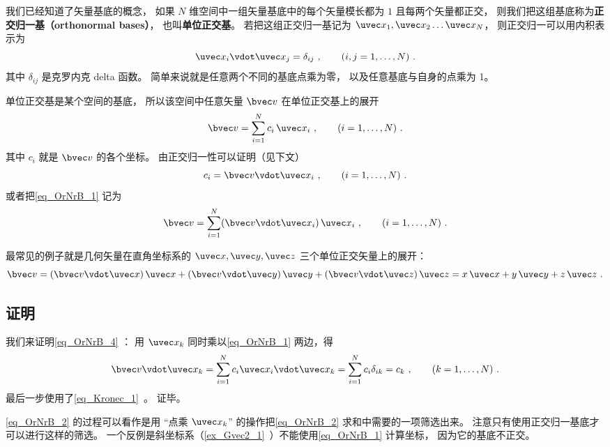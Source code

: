 

我们已经知道了矢量基底的概念， 如果 $N$ 维空间中一组矢量基底中的每个矢量模长都为 $1$ 且每两个矢量都正交， 则我们把这组基底称为\textbf{正交归一基（orthonormal bases）}， 也叫\textbf{单位正交基}。 若把这组正交归一基记为 $\uvec x_1,\uvec x_2\dots\uvec x_N$， 则正交归一可以用内积表示为
\begin{equation}\label{eq_OrNrB_3}
\uvec x_i \vdot \uvec x_j = \delta_{ij} ~,\qquad (i,j = 1,\dots, N)~.
\end{equation}
其中 $\delta_{ij}$ 是克罗内克 delta 函数。 简单来说就是任意两个不同的基底点乘为零， 以及任意基底与自身的点乘为 1。

单位正交基是某个空间的基底， 所以该空间中任意矢量 $\bvec v$ 在单位正交基上的展开
\begin{equation}\label{eq_OrNrB_1}
\bvec v = \sum_{i = 1}^N c_i \,\uvec x_i ~,\qquad (i = 1,\dots, N)~.
\end{equation}
其中 $c_i$ 就是 $\bvec v$ 的各个坐标。 由正交归一性可以证明（见下文）
\begin{equation}\label{eq_OrNrB_4}
c_i = \bvec v\vdot\uvec x_i ~,\qquad (i = 1,\dots, N)~.
\end{equation}
或者把\autoref{eq_OrNrB_1} 记为
\begin{equation}\label{eq_OrNrB_5}
\bvec v = \sum_{i = 1}^N (\bvec v\vdot\uvec x_i) \,\uvec x_i~, \qquad (i = 1,\dots, N)~.
\end{equation}

最常见的例子就是几何矢量在直角坐标系的 $\uvec x, \uvec y, \uvec z$ 三个单位正交矢量上的展开：
\begin{equation}
\bvec v = (\bvec v \vdot \uvec x)\,\uvec x + (\bvec v \vdot \uvec y)\,\uvec y + (\bvec v \vdot \uvec z)\,\uvec z = x \,\uvec x + y \,\uvec y + z \,\uvec z~.
\end{equation} 

\subsection{证明}
我们来证明\autoref{eq_OrNrB_4} ： 用 $\uvec x_k$ 同时乘以\autoref{eq_OrNrB_1} 两边，得
\begin{equation}\label{eq_OrNrB_2}
\bvec v \vdot \uvec x_k = \sum_{i = 1}^N  c_i \uvec x_i \vdot\uvec x_k = \sum_{i = 1}^N c_i \delta_{ik}  = c_k ~,\qquad (k = 1, \dots, N)~.
\end{equation}
最后一步使用了\autoref{eq_Kronec_1}~。 证毕。

\autoref{eq_OrNrB_2} 的过程可以看作是用 “点乘 $\uvec x_k$” 的操作把\autoref{eq_OrNrB_2} 求和中需要的一项筛选出来。 注意只有使用正交归一基底才可以进行这样的筛选。 一个反例是斜坐标系（\autoref{ex_Gvec2_1}~）不能使用\autoref{eq_OrNrB_1} 计算坐标， 因为它的基底不正交。
